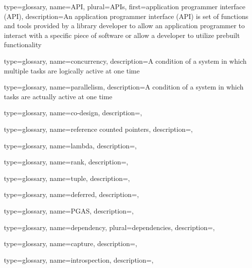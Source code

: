 {
  type=glossary,
  name={API},
  plural={APIs},
  first={application programmer interface (API)},
  description={An application programmer interface (API) is set of functions and tools provided by a library developer to allow an application programmer to interact with a specific piece of software or allow a developer to utilize prebuilt functionality}
}

{
  type=glossary,
  name={concurrency},
  description={A condition of a system in which multiple tasks are logically
    active at one time}
}

{
  type=glossary,
  name={parallelism},
  description={A condition of a system in which tasks are actually active at
    one time}
}

{
  type=glossary,
  name=co-design,
  description={},
}

{
  type=glossary,
  name=reference counted pointers,
  description={},
}

{
  type=glossary,
  name=lambda,
  description={},
}

{
  type=glossary,
  name=rank,
  description={},
}

{
  type=glossary,
  name=tuple,
  description={},
}


{
  type=glossary,
  name=deferred,
  description={},
}

{
  type=glossary,
  name=PGAS,
  description={},
}


{
  type=glossary,
  name=dependency,
  plural=dependencies,
  description={},
}

{
  type=glossary,
  name=capture,
  description={},
}

{
  type=glossary,
  name=introspection,
  description={},
}


